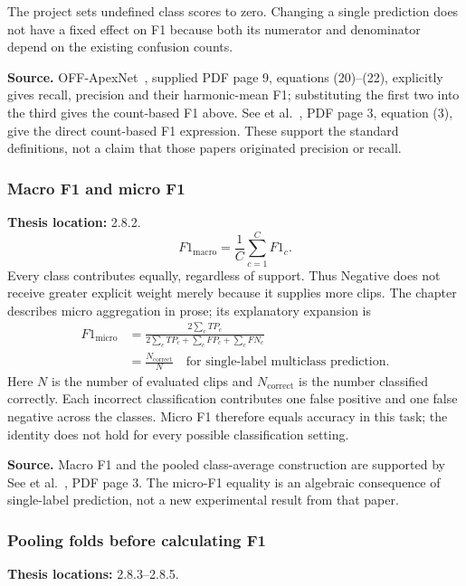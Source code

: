 \documentclass[11pt,a4paper]{article}
\numberwithin{equation}{section}
\begin{document}
The project sets undefined class scores to zero. Changing a single prediction
does not have a fixed effect on F1 because both its numerator and denominator
depend on the existing confusion counts.

\textbf{Source.} OFF-ApexNet~\cite{liong2019a}, supplied PDF page 9,
equations (20)--(22), explicitly gives recall, precision and their harmonic-mean
F1; substituting the first two into the third gives the count-based F1 above.
See et al.~\cite{see2019}, PDF page 3, equation (3), give the direct count-based
F1 expression. These support the standard definitions, not a claim that those
papers originated precision or recall.

\subsubsection{Macro F1 and micro F1}
\label{fg:macro}
\textbf{Thesis location:} 2.8.2.
\begin{equation}
    F1_{\mathrm{macro}}=\frac1C\sum_{c=1}^{C}F1_c.
    \label{fg:eq:macro}
\end{equation}
Every class contributes equally, regardless of support. Thus Negative does
not receive greater explicit weight merely because it supplies more clips.
The chapter describes micro aggregation in prose; its explanatory expansion is
\begin{equation}
\begin{aligned}
    F1_{\mathrm{micro}}&=
    \frac{2\sum_c TP_c}{2\sum_c TP_c+\sum_c FP_c+\sum_c FN_c}\\
    &=\frac{N_{\mathrm{correct}}}{N}
    \quad\text{for single-label multiclass prediction}.
\end{aligned}
    \label{fg:eq:micro}
\end{equation}
Here $N$ is the number of evaluated clips and $N_{\mathrm{correct}}$ is the
number classified correctly. Each incorrect classification contributes one false positive and one false
negative across the classes. Micro F1 therefore equals accuracy in this task;
the identity does not hold for every possible classification setting.

\textbf{Source.} Macro F1 and the pooled class-average construction are
supported by See et al.~\cite{see2019}, PDF page 3. The micro-F1 equality is
an algebraic consequence of single-label prediction, not a new experimental
result from that paper.

\subsubsection{Pooling folds before calculating F1}
\label{fg:fold-pooling}
\textbf{Thesis locations:} 2.8.3--2.8.5.
\end{document}
